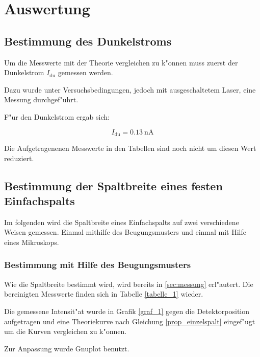 \section{Auswertung}
	\label{sec:Auswertung}

	\subsection{Bestimmung des Dunkelstroms}
		\label{sub:bestimmung_des_dunkelstroms}
		
		Um die Messwerte mit der Theorie vergleichen zu k"onnen muss zuerst der Dunkelstrom $I_\mathrm{du}$ gemessen werden.

		Dazu wurde unter Versuchsbedingungen, jedoch mit ausgeschaltetem Laser, eine Messung durchgef"uhrt.

		F"ur den Dunkelstrom ergab sich:

		\begin{equation}
			I_\mathrm{du} = \SI{0.13}{\nano \ampere}
		\end{equation}

		Die Aufgetragenenen Messwerte in den Tabellen sind noch nicht um diesen Wert reduziert.

	\subsection{Bestimmung der Spaltbreite eines festen Einfachspalts}
		\label{sub:bestimmung_der_spaltbreite_eines_festen_einfachspalts}
		
		Im folgenden wird die Spaltbreite eines Einfachspalts auf zwei verschiedene Weisen gemessen. Einmal mithilfe des Beugungsmusters und einmal mit Hilfe eines Mikroskops.

		\subsubsection{Bestimmung mit Hilfe des Beugungsmusters}
			\label{sub:Bestimmung_mit_Hilfe_des_Beugungsmusters}

			Wie die Spaltbreite bestimmt wird, wird bereits in \ref{sec:messung} erl"autert. Die bereinigten Messwerte finden sich in Tabelle \ref{tabelle_1} wieder.

			Die gemessene Intensit"at wurde in Grafik \ref{graf_1} gegen die Detektorposition aufgetragen und eine Theoriekurve nach Gleichung \ref{prop_einzelspalt} eingef"ugt um die Kurven vergleichen zu k"onnen.

			Zur Anpassung wurde Gnuplot benutzt.

